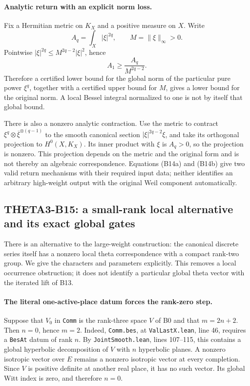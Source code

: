 \paragraph{Analytic return with an explicit norm loss.}
Fix a Hermitian metric on $K_X$ and a positive measure on $X$. Write
\[
 A_q=\int_X|\xi|^{2q},\qquad M=\|\xi\|_\infty>0.
\]
Pointwise $|\xi|^{2q}\leq M^{2q-2}|\xi|^2$, hence
\[
 A_1\geq \frac{A_q}{M^{2q-2}}.
 \tag{B14b}
\]
Therefore a certified lower bound for the global norm of the particular pure power $\xi^q$, together with a certified upper bound for $M$, gives a lower bound for the original norm. A local Bessel integral normalized to one is not by itself that global bound.

There is also a nonzero analytic contraction. Use the metric to contract
$\xi^q\otimes\overline{\xi}^{\otimes(q-1)}$ to the smooth canonical section
$|\xi|^{2q-2}\xi$, and take its orthogonal projection to $H^0(X,K_X)$. Its inner product with $\xi$ is $A_q>0$, so the projection is nonzero. This projection depends on the metric and the original form and is not thereby an algebraic correspondence. Equations (B14a) and (B14b) give two valid return mechanisms with their required input data; neither identifies an arbitrary high-weight output with the original Weil component automatically.

\subsection{THETA3-B15: a small-rank local alternative and its exact global gates}\label{B15}

There is an alternative to the large-weight construction: the canonical discrete series itself has a nonzero local theta correspondence with a compact rank-two group. We give the characters and parameters explicitly. This removes a local occurrence obstruction; it does not identify a particular global theta vector with the iterated lift of B13.

\paragraph{The literal one-active-place datum forces the rank-zero step.}
Suppose that $V_0$ in \texttt{Comm} is the rank-three space $V$ of B0 and that $m=2n+2$. Then $n=0$, hence $m=2$. Indeed, \texttt{Comm.bes}, at \texttt{ValLastX.lean}, line 46, requires a \texttt{BesAt} datum of rank $n$. By \texttt{JointSmooth.lean}, lines 107--115, this contains a global hyperbolic decomposition of $V$ with $n$ hyperbolic planes. A nonzero isotropic vector over $E$ remains a nonzero isotropic vector at every completion. Since $V$ is positive definite at another real place, it has no such vector. Its global Witt index is zero, and therefore $n=0$.

